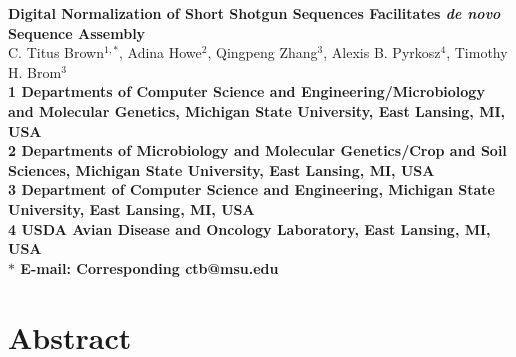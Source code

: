 \documentclass[10pt]{article}
\date{}
\begin{document}
\begin{flushleft}
{\Large
\textbf{Digital Normalization of Short Shotgun Sequences Facilitates
{\em de novo} Sequence Assembly}
}
\\
C. Titus Brown$^{1,\ast}$, 
Adina Howe$^{2}$,
Qingpeng Zhang$^{3}$,
Alexis B. Pyrkosz$^{4}$,
Timothy H. Brom$^{3}$
\\
\bf{1} Departments of Computer Science and Engineering/Microbiology and Molecular Genetics, Michigan State University, East Lansing, MI, USA
\\
\bf{2} Departments of Microbiology and Molecular Genetics/Crop and Soil Sciences, Michigan State University, East Lansing, MI, USA
\\
\bf{3} Department of Computer Science and Engineering, Michigan State University, East Lansing, MI, USA
\\
{\bf{4} USDA Avian Disease and Oncology Laboratory, East Lansing, MI, USA}
\\
$\ast$ E-mail: Corresponding ctb@msu.edu
\end{flushleft}

\section*{Abstract}
\end{document}
